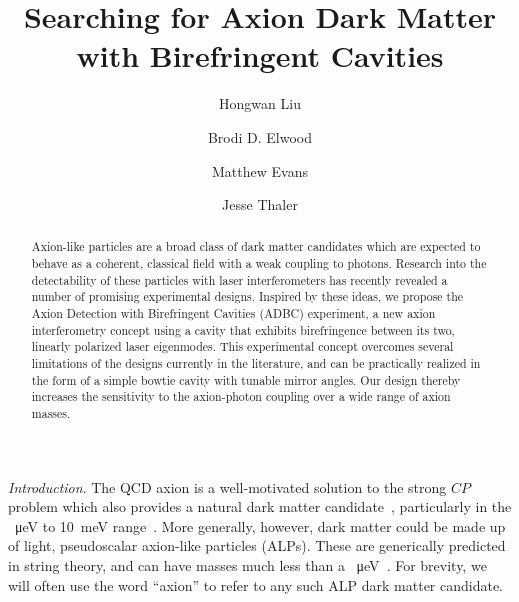 \documentclass[aps,prd,nofootinbib,twocolumn,superscriptaddress,preprintnumbers,letterpaper, longbibliography]{revtex4-1}
\begin{document}

\title{
    Searching for Axion Dark Matter with Birefringent Cavities
}

\author{Hongwan Liu}

\author{Brodi D. Elwood}

\author{Matthew Evans}

\author{Jesse Thaler}

\begin{abstract} 
Axion-like particles are a broad class of dark matter candidates which are expected to behave as a coherent, classical field with a weak coupling to photons. 
Research into the detectability of these particles with laser interferometers has recently revealed a number of promising experimental designs. Inspired by these ideas, we propose the Axion Detection with Birefringent Cavities (ADBC) experiment, a new axion interferometry concept using a cavity that exhibits birefringence between its two, linearly polarized laser eigenmodes. This experimental concept overcomes several limitations of the designs currently in the literature, and can be practically realized in the form of a simple bowtie cavity with tunable mirror angles. Our design thereby increases the sensitivity to the axion-photon coupling over a wide range of axion masses. 

\end{abstract}


\maketitle
%
\textit{Introduction}. The QCD axion is a well-motivated solution to the strong $CP$ problem which also provides a natural dark matter candidate~\cite{Peccei:1977hh,Peccei:1977ur,Weinberg:1977ma,Wilczek:1977pj,Preskill:1982cy,Abbott:1982af,Dine:1982ah}, particularly in the \SI{}{\micro\eV} to \SI{10}{\milli\eV} range~\cite{Graham:2015ouw}. More generally, however, dark matter could be made up of light, pseudoscalar axion-like particles (ALPs). These are generically predicted in string theory, and can have masses much less than a \SI{}{\micro\eV}~\cite{Jaeckel:2010ni,Svrcek:2006yi,Arvanitaki:2009fg,Acharya:2010zx,Cicoli:2012sz}. For brevity, we will often use the word ``axion'' to refer to any such ALP dark matter candidate.  
\end{document}
